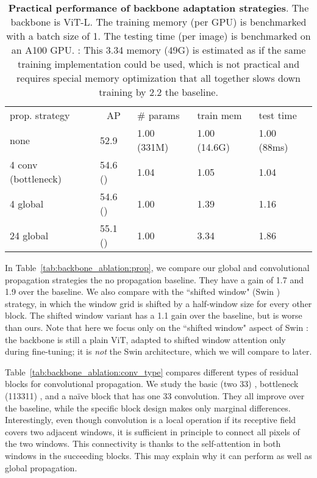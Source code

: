 \documentclass[runningheads]{llncs}
\newcommand{\res}[2]{{#1} {({\gain{#2}})}}
\begin{document}
\begin{table}[t]
    \begin{tabular}{@{}l|llll@{}}
        prop. strategy & \multicolumn{1}{c}{AP} & \# params & train mem & test time \\
        \shline
        none  &  52.9 & 1.00 {\scriptsize (331M)} & 1.00 {\scriptsize (14.6G)} & 1.00 {\scriptsize (88ms)} \\ 
        \hline  
        4 conv (bottleneck) & \res{54.6}{+1.7} & 1.04 & 1.05 & 1.04 \\
        4 global & \res{54.6}{+1.7} & 1.00 & 1.39 & 1.16 \\
        24 global & \res{55.1}{+2.2} & 1.00 & 3.34 & 1.86 \\
    \end{tabular}
    \vspace{.5em}
    \caption{\textbf{Practical performance of backbone adaptation strategies}. The backbone is \mbox{ViT-L}. The training memory (per GPU) is benchmarked with a batch size of 1. The testing time (per image) is benchmarked on an A100 GPU. {: This 3.34 memory (49G) is estimated as if the same training implementation could be used, which is not practical and requires special memory optimization that all together slows down training by 2.2 \vs the baseline.}
    \label{tab:complexity}
    }
\vspace{-1.5em}
\end{table}

In Table~\ref{tab:backbone_ablation:prop}, we compare our global and convolutional propagation strategies \vs the no propagation baseline. They have a gain of 1.7 and 1.9 over the baseline. We also compare with the ``shifted window" (Swin \cite{Liu2021}) strategy, in which the window grid is shifted by a half-window size for every other block. The shifted window variant has a 1.1 gain over the baseline, but is worse than ours.
Note that here we focus only on the ``shifted window" aspect of Swin \cite{Liu2021}: the backbone is still a plain ViT, adapted to shifted window attention only during fine-tuning; it is \textit{not} the Swin architecture, which we will compare to later.

Table~\ref{tab:backbone_ablation:conv_type} compares different types of residual blocks for convolutional propagation. We study the basic (two 33) \cite{He2016}, bottleneck (113311) \cite{He2016}, and a na\"ive block that has one 33 convolution. They all improve over the baseline, while the specific block design makes only marginal differences. Interestingly, even though convolution is a local operation if its receptive field covers two adjacent windows, it is sufficient in principle to connect all pixels of the two windows. This connectivity is thanks to the self-attention in both windows in the succeeding blocks. This may explain why it can perform as well as global propagation.
\end{document}
